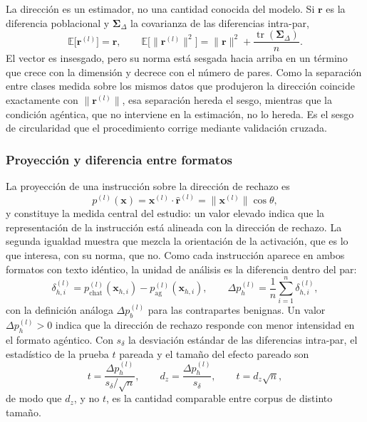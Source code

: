 La dirección es un estimador, no una cantidad conocida del modelo. Si $\bm{r}$ es la diferencia poblacional y $\bm{\Sigma}_{\Delta}$ la covarianza de las diferencias intra-par,
\begin{equation}
\mathbb{E}\big[\bm{r}^{(l)}\big] = \bm{r},
\qquad
\mathbb{E}\big[\lVert \bm{r}^{(l)} \rVert^{2}\big] = \lVert \bm{r} \rVert^{2} + \frac{\operatorname{tr}(\bm{\Sigma}_{\Delta})}{n}.
\label{eq:sesgo-norma}
\end{equation}
El vector es insesgado, pero su norma está sesgada hacia arriba en un término que crece con la dimensión y decrece con el número de pares. Como la separación entre clases medida sobre los mismos datos que produjeron la dirección coincide exactamente con $\lVert \bm{r}^{(l)} \rVert$, esa separación hereda el sesgo, mientras que la condición agéntica, que no interviene en la estimación, no lo hereda. Es el sesgo de circularidad que el procedimiento corrige mediante validación cruzada.

\subsubsection*{Proyección y diferencia entre formatos}

La proyección de una instrucción sobre la dirección de rechazo es
\begin{equation}
p^{(l)}(\bm{x}) = \bm{x}^{(l)} \cdot \hat{\bm{r}}^{(l)} = \lVert \bm{x}^{(l)} \rVert \cos\theta,
\label{eq:proyeccion}
\end{equation}
y constituye la medida central del estudio: un valor elevado indica que la representación de la instrucción está alineada con la dirección de rechazo. La segunda igualdad muestra que mezcla la orientación de la activación, que es lo que interesa, con su norma, que no. Como cada instrucción aparece en ambos formatos con texto idéntico, la unidad de análisis es la diferencia dentro del par:
\begin{equation}
\delta_{h,i}^{(l)} = p^{(l)}_{\text{chat}}(\bm{x}_{h,i}) - p^{(l)}_{\text{ag}}(\bm{x}_{h,i}),
\qquad
\Delta p_{h}^{(l)} = \frac{1}{n} \sum_{i=1}^{n} \delta_{h,i}^{(l)},
\label{eq:gap}
\end{equation}
con la definición análoga $\Delta p_{b}^{(l)}$ para las contrapartes benignas. Un valor $\Delta p_{h}^{(l)} > 0$ indica que la dirección de rechazo responde con menor intensidad en el formato agéntico. Con $s_{\delta}$ la desviación estándar de las diferencias intra-par, el estadístico de la prueba $t$ pareada y el tamaño del efecto pareado son
\begin{equation}
t = \frac{\Delta p_{h}^{(l)}}{s_{\delta} / \sqrt{n}},
\qquad
d_{z} = \frac{\Delta p_{h}^{(l)}}{s_{\delta}},
\qquad
t = d_{z} \sqrt{n},
\label{eq:dz}
\end{equation}
de modo que $d_z$, y no $t$, es la cantidad comparable entre corpus de distinto tamaño.

